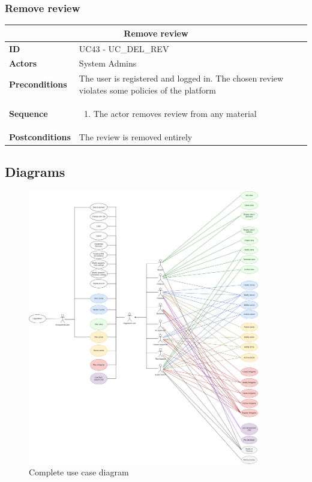 \subsubsection{Remove review}
\begin{tabular}{|m{2.5cm}|m{8cm}|}
	\hline
	\multicolumn{2}{|c|}{Remove review} \\
	\hline
	\textbf{ID} & UC43 - UC\_DEL\_REV \\
	\hline
	\textbf{Actors} & System Admins \\
	\hline
	\textbf{Preconditions} & The user is registered and logged in. The chosen review violates some policies of the platform \\
	\hline
	\textbf{Sequence} & 
	\begin{enumerate}
		\item The actor removes review from any material
	\end{enumerate} \\
	\hline
	\textbf{Postconditions} & The review is removed entirely \\
	\hline
\end{tabular}

\newpage
\subsection{Diagrams}
\begin{figure}[h]
	\centering
	\includegraphics[width=0.9\textwidth]{images/usecase-diagram.png}
	\caption{Complete use case diagram}
	\label{fig:usecase-diagram}
\end{figure}

